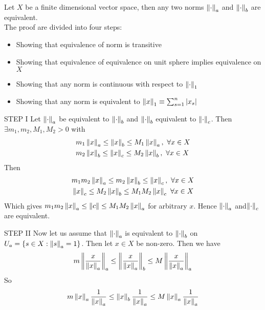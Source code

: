 \begin{theorem}\rm\nextline
	Let $X$ be a finite dimensional vector space, then any two norms $\left\|{\cdot}\right\|_a$ and $\left\|{\cdot}\right\|_b$ are equivalent.\\
	\prf The proof are divided into four steps:
	\begin{itemize}
		\item Showing that equivalence of norm is transitive
		\item Showing that equivalence of equivalence on unit sphere implies equivalence on $X$
		\item Showing that any norm is continuous with respect to $\left\|{\cdot}\right\|_1$
		\item Showing that any norm is equivalent to $\left\|{x}\right\|_1\equiv\sum_{s=1}^n |x_s|$
	\end{itemize}
	\begin{pf}{STEP I}{}
		Let $\left\|{\cdot}\right\|_a$ be equivalent to $\left\|{\cdot}\right\|_b$ and $\left\|{\cdot}\right\|_b$ equivalent to $\left\|{\cdot}\right\|_c$.
		Then $\exists m_1,m_2,M_1,M_2>0$ with
		\begin{equation}
			\begin{split}\nonumber
				&m_1\left\|{x}\right\|_a\leq \left\|{x}\right\|_b\leq M_1\left\|{x}\right\|_a,\,\,\forall x\in X\\
				&m_2\left\|{x}\right\|_b\leq \left\|{x}\right\|_c\leq M_2\left\|{x}\right\|_b,\,\,\forall x\in X
			\end{split}
		\end{equation}
		Then
		\begin{equation}
			\begin{split}\nonumber
				&m_1m_2\left\|{x}\right\|_a\leq m_2\left\|{x}\right\|_b\leq \left\|{x}\right\|_c,\,\,\forall x\in X\\
				&\left\|{x}\right\|_c\leq M_2\left\|{x}\right\|_b\leq M_1M_2\left\|{x}\right\|_c\,\,\forall x\in X
			\end{split}
		\end{equation}
		Which gives $m_1m_2\left\|{x}\right\|_a\leq\left\|{c}\right\|\leq M_1M_2\left\|{x}\right\|_a$ for arbitrary $x$. Hence $\left\|{\cdot}\right\|_a$ and$\left\|{\cdot}\right\|_c$ are equivalent.
	\end{pf}
	\begin{pf}{STEP II}{}
		Now let us assume that $\left\|{\cdot}\right\|_a$ is equivalent to $\left\|{\cdot}\right\|_b$ on $U_a=\{s\in X:\left\|{s}\right\|_a=1\}$.
		Then let $x\in X$ be non-zero. Then we have
		$$
			m\left\|{\frac{x}{\left\|{x}\right\|_a}}\right\|_a\leq \left\|{\frac{x}{\left\|{x}\right\|_a}}\right\|_b\leq M\left\|{\frac{x}{\left\|{x}\right\|_a}}\right\|_a
		$$
		So
		$$
			m\left\|{x}\right\|_a\frac{1}{\left\|{x}\right\|_a}\leq \left\|{x}\right\|_b\frac{1}{\left\|{x}\right\|_a}\leq M\left\|{x}\right\|_a\frac{1}{\left\|{x}\right\|_a}
$$
\end{pf}
\end{theorem}
